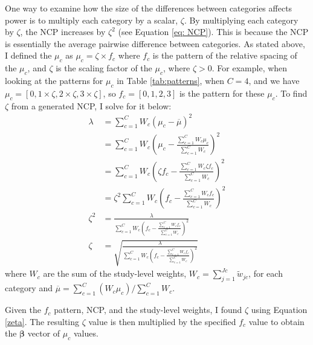 One way to examine how the size of the differences between categories affects power is to multiply each category by a scalar, $\zeta$. By multiplying each category by $\zeta$, the NCP increases by $\zeta^2$ (see Equation \ref{eq: NCP}). This is because the NCP is essentially the average pairwise difference between categories. As stated above, I defined the $\mu_c$ as $\mu_c = \zeta \times f_c$ where $f_c$ is the pattern of the relative spacing of the $\mu_c$, and $\zeta$ is the scaling factor of the $\mu_c$, where $\zeta > 0$. For example, when looking at the patterns for $\mu_c$ in Table \ref{tab:patterns}, when $C=4$, and we have $\mu_c = [0, 1 \times \zeta, 2 \times \zeta, 3 \times \zeta]$, so $f_c = [0, 1, 2, 3]$ is the pattern for these $\mu_c$. To find $\zeta$ from a generated NCP, I solve for it below: 
\begin{equation}
    \label{zeta}
    \begin{split}
    \lambda &= \sum_{c=1}^C W_c (\mu_c - \overline{\mu})^2 \\
    &= \sum_{c=1}^C W_c \left(\mu_c - \frac{\sum_{c=1}^C W_c \mu_c}{\sum_{c=1}^C W_c}\right)^2 \\
    &= \sum_{c=1}^C W_c \left(\zeta f_c - \frac{\sum_{c=1}^C W_c \zeta f_c}{\sum_{c=1}^C W_c}\right)^2 \\
    &= \zeta^2\sum_{c=1}^C W_c \left(f_c - \frac{\sum_{c=1}^C W_c  f_c}{\sum_{c=1}^C W_c}\right)^2 \\
    \zeta^2 &= \frac{\lambda}{\sum_{c=1}^C W_c \left(f_c - \frac{\sum_{c=1}^C W_c f_c}{\sum_{c=1}^C W_c}\right)^2 } \\
    \zeta &= \sqrt{ \frac{\lambda}{\sum_{c=1}^C W_c \left(f_c - \frac{\sum_{c=1}^C W_c f_c}{\sum_{c=1}^C W_c}\right)^2} }
    \end{split}
\end{equation}
where  $W_c$ are the sum of the study-level weights, $W_c = \sum_{j=1}^{Jc} \tilde{w}_{jc}$, for each category and $\overline{\mu} = \sum_{c=1}^C (W_c \mu_c)/\sum_{c=1}^C W_c$. 

Given the $f_c$ pattern, NCP, and the study-level weights, I found $\zeta$ using Equation \ref{zeta}. The resulting $\zeta$ value is then multiplied by the specified $f_c$ value to obtain the $\bm{\beta}$ vector of $\mu_c$ values. 




